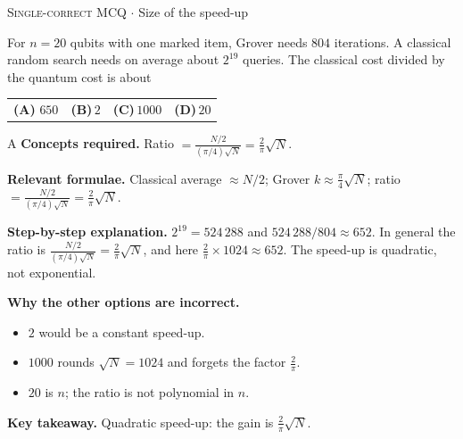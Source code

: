 \documentclass[11pt,a4paper]{article}
\newcommand{\optlabel}[1]{\textbf{(#1)}}
\newcommand{\correctlabel}[1]{\textcolor{okgreen}{\textbf{(#1)}\,\ding{51}}}
\newenvironment{qitem}[1]{\begin{list}{}{\setlength{\leftmargin}{3.3em}\setlength{\labelwidth}{3.1em}%
  \setlength{\labelsep}{0.2em}\setlength{\topsep}{3pt}\setlength{\parsep}{3pt}}\item[\textbf{Q.#1}\hfill]}{\end{list}}
\newcommand{\qsep}{\par\vspace{2pt}{\color{black!15}\hrule}\vspace{4pt}}
\newcommand{\qmeta}[2]{{\footnotesize\color{black!60}\textsc{#1} \;$\cdot$\; #2}\par}
\begin{document}
\begin{qitem}{53}
\qmeta{Single-correct MCQ}{Size of the speed-up}
For $n = 20$ qubits with one marked item, Grover needs $804$ iterations. A classical random search needs on average about $2^{19}$ queries. The classical cost divided by the quantum cost is about
\par\smallskip\noindent\begin{tabularx}{\linewidth}{@{}*{4}{L}@{}}
\correctlabel{A}\,$650$ & \optlabel{B}\,$2$ & \optlabel{C}\,$1000$ & \optlabel{D}\,$20$
\end{tabularx}
\end{qitem}
\begin{solbox}{A}
\textbf{\color{brand}Concepts required.} Ratio $= \frac{N/2}{(\pi/4)\sqrt N} = \frac2\pi\sqrt N$.

\textbf{\color{brand}Relevant formulae.} Classical average $\approx N/2$; Grover $k \approx \frac\pi4\sqrt N$; ratio $= \frac{N/2}{(\pi/4)\sqrt N} = \frac2\pi\sqrt N$.

\textbf{\color{brand}Step-by-step explanation.} $2^{19} = 524\,288$ and $524\,288/804 \approx 652$. In general the ratio is $\frac{N/2}{(\pi/4)\sqrt N} = \frac{2}{\pi}\sqrt N$, and here $\frac2\pi\times1024 \approx 652$. The speed-up is quadratic, not exponential.

\textbf{\color{brand}Why the other options are incorrect.}
\begin{itemize}[leftmargin=2.4em, itemsep=1pt, topsep=2pt]
\item[\textbf{(B)}] $2$ would be a constant speed-up.
\item[\textbf{(C)}] $1000$ rounds $\sqrt N = 1024$ and forgets the factor $\frac2\pi$.
\item[\textbf{(D)}] $20$ is $n$; the ratio is not polynomial in $n$.
\end{itemize}
\textbf{\color{brand}Key takeaway.} Quadratic speed-up: the gain is $\frac2\pi\sqrt N$.
\end{solbox}
\qsep
\end{document}
